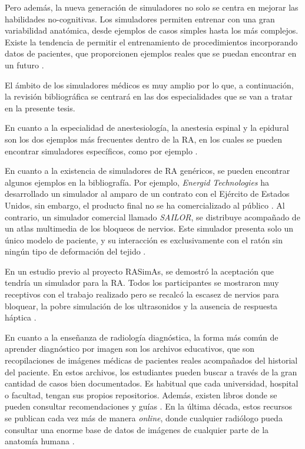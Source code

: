 Pero además, la nueva generación de simuladores no solo se centra en mejorar las habilidades no-cognitivas. Los simuladores permiten entrenar con una gran variabilidad anatómica, desde ejemplos de casos simples hasta los más complejos. Existe la tendencia de permitir el entrenamiento de procedimientos incorporando datos de pacientes, que proporcionen ejemplos reales que se puedan encontrar en un futuro \cite{Willaert2012, ZHANG2017599}. 

El ámbito de los simuladores médicos es muy amplio por lo que, a continuación, la revisión bibliográfica se centrará en las dos especialidades que se van a tratar en la presente tesis.


En cuanto a la especialidad de anestesiología, la anestesia espinal y la epidural son los dos ejemplos más frecuentes dentro de la \ac{RA}, en los cuales se pueden encontrar simuladores específicos, como por ejemplo \cite{broom2018evaluation}. %

En cuanto a la existencia de simuladores de \ac{RA} genéricos, se pueden encontrar algunos ejemplos en la bibliografía. Por ejemplo, \emph{Energid Technologies} ha desarrollado un simulador al amparo de un contrato con el Ejército de Estados Unidos, sin embargo, el producto final no se ha comercializado al público \cite{lim2008simulation}. Al contrario, un simulador comercial llamado \emph{SAILOR}, se distribuye acompañado de un atlas multimedia de los bloqueos de nervios. Este simulador presenta solo un único modelo de paciente, y su interacción es exclusivamente con el ratón sin ningún tipo de deformación del tejido \cite{Bibin}. 

En un estudio previo al proyecto \ac{RASimAs}, se demostró la aceptación que tendría un simulador para la \ac{RA}. Todos los participantes se mostraron muy receptivos con el trabajo realizado pero se recalcó la escasez de nervios para bloquear, la pobre simulación de los ultrasonidos y la ausencia de respuesta háptica \cite{Grottke2009594}.


En cuanto a la enseñanza de radiología diagnóstica, la forma más común de aprender diagnóstico por imagen son los archivos educativos, que son recopilaciones de imágenes médicas de pacientes reales acompañados del historial del paciente. En estos archivos, los estudiantes pueden buscar a través de la gran cantidad de casos bien documentados. Es habitual que cada universidad, hospital o facultad, tengan sus propios repositorios. Además, existen libros donde se pueden consultar recomendaciones y guías \cite{carver2012medical,manualpractico}. 
En la última década, estos recursos se publican cada vez más de manera \emph{online}, donde cualquier radiólogo pueda consultar una enorme base de datos de imágenes de cualquier parte de la anatomía humana \cite{deshpande2017integrated}. 


